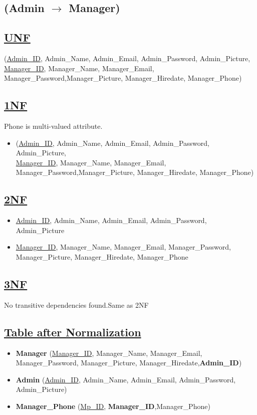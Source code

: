 \subsection{\texorpdfstring{\centering (Admin $\rightarrow$ Manager)}{(Admin - Manager)}}


\subsection*{\underline{UNF}}

(\underline{Admin\_ID}, Admin\_Name, Admin\_Email, Admin\_Password, Admin\_Picture,\\
\underline{Manager\_ID}, Manager\_Name, Manager\_Email, Manager\_Password,Manager\_Picture, Manager\_Hiredate, Manager\_Phone)

\subsection*{\underline{1NF}}
Phone is multi-valued attribute.
\vskip 0.2in

\begin{itemize}
    \item (\underline{Admin\_ID}, Admin\_Name, Admin\_Email, Admin\_Password, Admin\_Picture,\\
          \underline{Manager\_ID}, Manager\_Name, Manager\_Email, Manager\_Password,Manager\_Picture, Manager\_Hiredate, Manager\_Phone)
\end{itemize}

\subsection*{\underline{2NF}}
\vskip 0.2in

\begin{itemize}
    \item \underline{Admin\_ID}, Admin\_Name, Admin\_Email, Admin\_Password, Admin\_Picture
    \item \underline{Manager\_ID}, Manager\_Name, Manager\_Email, Manager\_Password, Manager\_Picture, Manager\_Hiredate, Manager\_Phone
\end{itemize}

\subsection*{\underline{3NF}}
No transitive dependencies found.Same as 2NF

\subsection*{\underline{Table after Normalization}}
\vskip 0.2in
\begin{itemize}
    \item \textbf{Manager} (\underline{Manager\_ID}, Manager\_Name, Manager\_Email, Manager\_Password, Manager\_Picture, Manager\_Hiredate,\textbf{Admin\_ID})
    \item \textbf{Admin} (\underline{Admin\_ID}, Admin\_Name, Admin\_Email, Admin\_Password, Admin\_Picture)
    \item \textbf{Manager\_Phone} (\underline{Mp\_ID}, \textbf{Manager\_ID},{Manager\_Phone})
\end{itemize}

\clearpage